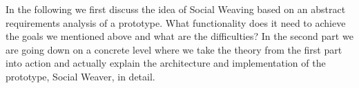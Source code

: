 In the following we first discuss the idea of Social Weaving based on  an abstract requirements analysis of a prototype. What functionality does it need to achieve the goals we mentioned above and what are the difficulties? In the second part we are going down on a concrete level where we take the theory from the first part into action and actually explain the architecture and implementation of the prototype, Social Weaver, in detail. 